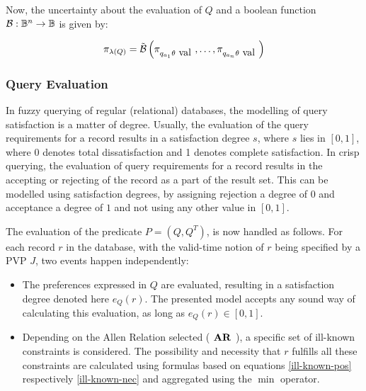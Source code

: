 Now, the uncertainty about the evaluation of $Q$ and a boolean function $\operatorname*{\mathcal{B}}:\mathbb{B}^{n}  \rightarrow \mathbb{B}$ is given by:

\begin{equation}
 \label{eq:evaluation-lambda-function}
\pi_{\lambda \left(Q \right)} = \tilde{\operatorname*{\mathcal{B}}} \left(\pi_{q_{a_1}  \theta \mbox{ val }}, \ldots, \pi_{q_{a_n}  \theta \mbox{ val }} \right)
\end{equation}




% 


\subsubsection{Query Evaluation}
In fuzzy querying of regular (relational) databases, the modelling of query satisfaction is a matter of degree. Usually, the evaluation of the query requirements for a record results in a satisfaction degree $s$, where $s$ lies in $\left[0,1\right]$, where 0 denotes total dissatisfaction and 1 denotes complete satisfaction. In crisp querying, the evaluation of query requirements for a record results in the accepting or rejecting of the record as a part of the result set. This can be modelled using satisfaction degrees, by assigning rejection a degree of $0$ and acceptance a degree of $1$ and not using any other value in $\left[0,1\right]$.

The evaluation of the predicate $P = \left( Q, Q^T \right)$, is now handled as follows. For each record $r$ in the database, with the valid-time notion of $r$ being specified by a PVP $J$, two events happen independently:


\begin{itemize}
\item
The preferences expressed in $Q$ are evaluated, resulting in a satisfaction degree denoted here $e_{Q}(r)$. The presented model accepts any sound way of calculating this evaluation, as long as $e_{Q}(r) \in \left[0,1\right]$. 
\item
Depending on the Allen Relation selected ($\mbox{\textbf{ AR }}$), a specific set of ill-known constraints is considered. The possibility and necessity that $r$ fulfills all these constraints are calculated using formulas based on equations \eqref{ill-known-pos} respectively \eqref{ill-known-nec} and aggregated using the $\min$ operator. 
\end{itemize}



